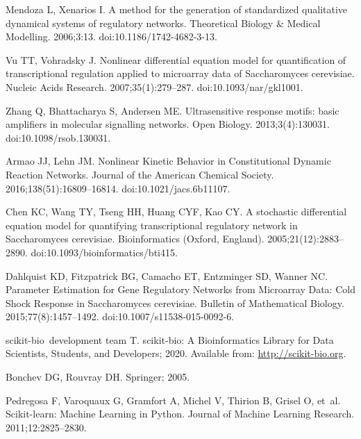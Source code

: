 \documentclass[10pt,letterpaper]{article}
\begin{document}
\begin{thebibliography}{10}
Mendoza L, Xenarios I.
\newblock A method for the generation of standardized qualitative dynamical
  systems of regulatory networks.
\newblock Theoretical Biology \& Medical Modelling. 2006;3:13.
\newblock doi:{10.1186/1742-4682-3-13}.

Vu TT, Vohradsky J.
\newblock Nonlinear differential equation model for quantification of
  transcriptional regulation applied to microarray data of {Saccharomyces}
  cerevisiae.
\newblock Nucleic Acids Research. 2007;35(1):279--287.
\newblock doi:{10.1093/nar/gkl1001}.

Zhang Q, Bhattacharya S, Andersen ME.
\newblock Ultrasensitive response motifs: basic amplifiers in molecular
  signalling networks.
\newblock Open Biology. 2013;3(4):130031.
\newblock doi:{10.1098/rsob.130031}.

Armao JJ, Lehn JM.
\newblock Nonlinear {Kinetic} {Behavior} in {Constitutional} {Dynamic}
  {Reaction} {Networks}.
\newblock Journal of the American Chemical Society. 2016;138(51):16809--16814.
\newblock doi:{10.1021/jacs.6b11107}.

Chen KC, Wang TY, Tseng HH, Huang CYF, Kao CY.
\newblock A stochastic differential equation model for quantifying
  transcriptional regulatory network in {Saccharomyces} cerevisiae.
\newblock Bioinformatics (Oxford, England). 2005;21(12):2883--2890.
\newblock doi:{10.1093/bioinformatics/bti415}.

Dahlquist KD, Fitzpatrick BG, Camacho ET, Entzminger SD, Wanner NC.
\newblock Parameter {Estimation} for {Gene} {Regulatory} {Networks} from
  {Microarray} {Data}: {Cold} {Shock} {Response} in {Saccharomyces} cerevisiae.
\newblock Bulletin of Mathematical Biology. 2015;77(8):1457--1492.
\newblock doi:{10.1007/s11538-015-0092-6}.

scikit-bio~development team T. scikit-bio: A Bioinformatics Library for Data
  Scientists, Students, and Developers; 2020.
\newblock Available from: \url{http://scikit-bio.org}.

Bonchev DG, Rouvray DH.
\newblock Springer; 2005.

Pedregosa F, Varoquaux G, Gramfort A, Michel V, Thirion B, Grisel O, et~al.
\newblock Scikit-learn: Machine Learning in {P}ython.
\newblock Journal of Machine Learning Research. 2011;12:2825--2830.


\end{thebibliography}
\end{document}
